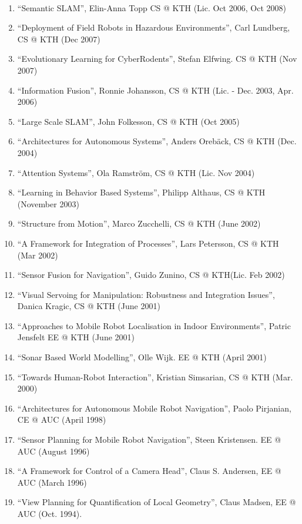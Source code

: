 \documentclass{article}
\begin{document}
\begin{cv}
\begin{cvlist}{~}
\begin{enumerate}
    (Dec. 2009)
  \item ``Semantic SLAM'', Elin-Anna Topp CS @ KTH (Lic. Oct 2006, Oct
    2008)
  \item ``Deployment of Field Robots in Hazardous Environments'', Carl
    Lundberg, CS @ KTH (Dec 2007)
  \item ``Evolutionary Learning for CyberRodents'', Stefan Elfwing.
    CS @ KTH (Nov 2007)
  \item ``Information Fusion'', Ronnie Johansson, CS @ KTH (Lic. -
    Dec. 2003, Apr. 2006)
  \item ``Large Scale SLAM'', John Folkesson, CS @ KTH (Oct 2005)
  \item ``Architectures for Autonomous Systems'', Anders Oreb{\"a}ck,
    CS @ KTH (Dec. 2004)
  \item ``Attention Systems'', Ola Ramstr\"om, CS @ KTH (Lic. Nov 2004)
  \item ``Learning in Behavior Based Systems'', Philipp Althaus, CS @
    KTH (November 2003)
  \item ``Structure from Motion'', Marco Zucchelli, CS @ KTH (June 2002)
  \item ``A Framework for Integration of Processes'', Lars Petersson,
    CS @ KTH (Mar 2002)
  \item ``Sensor Fusion for Navigation'', Guido Zunino, CS @
    KTH(Lic. Feb 2002)
  \item ``Visual Servoing for Manipulation: Robustness and Integration
    Issues'', Danica Kragic, CS @ KTH (June 2001)
  \item ``Approaches to Mobile Robot Localisation in Indoor
    Environments'', Patric Jensfelt EE @ KTH (June 2001)
  \item ``Sonar Based World Modelling'', Olle Wijk.  EE @ KTH (April 2001)
  \item ``Towards Human-Robot Interaction'', Kristian Simsarian, CS @
    KTH (Mar. 2000)
  \item ``Architectures for Autonomous Mobile Robot Navigation'',
    Paolo Pirjanian, CE @ AUC (April 1998)
  \item ``Sensor Planning for Mobile Robot Navigation'', Steen
    Kristensen.  EE @ AUC (August 1996)
  \item ``A Framework for Control of a Camera Head'', Claus
    S. Andersen, EE @ AUC (March 1996)
  \item ``View Planning for Quantification of Local Geometry'', Claus
    Madsen, EE @ AUC (Oct. 1994).
\end{enumerate}


\end{cvlist}
\end{cv}
\end{document}
